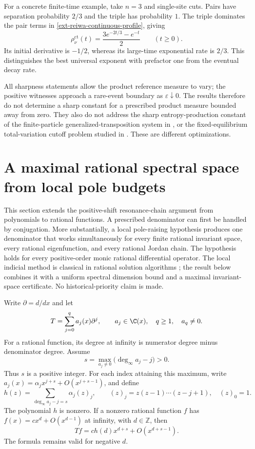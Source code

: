 \documentclass[11pt,a4paper]{article}
\theoremstyle{definition}\newtheorem{definition}[theorem]{Definition}
\theoremstyle{remark}\newtheorem{remark}[theorem]{Remark}
\numberwithin{equation}{section}
\begin{document}
For a concrete finite-time example, take $n=3$ and single-site cuts.
Pairs have separation probability $2/3$ and the triple has probability
$1$.  The triple dominates the pair terms in
\eqref{ext-reiwa-continuous-profile}, giving
\[
 \rho_{\nu}^{\mathrm{ct}}(t)
   =\frac{3e^{-2t/3}-e^{-t}}{2}\qquad(t\geq0).
\]
Its initial derivative is $-1/2$, whereas its large-time exponential
rate is $2/3$.  This distinguishes the best universal exponent with
prefactor one from the eventual decay rate.

All sharpness statements allow the product reference measure to vary;
the positive witnesses approach a rare-event boundary as
$\varepsilon\downarrow0$.  The results therefore do not determine a
sharp constant for a prescribed product measure bounded away from
zero.  They also do not address the sharp entropy-production constant
of the finite-particle generalized-transposition system in
\cite{ext-reiwa-CP}, or the fixed-equilibrium total-variation cutoff
problem studied in \cite{ext-reiwa-KS}.  These are different
optimizations.


\clearpage
{}
\section{A maximal rational spectral space from local pole budgets}
\label{ext-heisei-section}

This section extends the positive-shift resonance-chain argument from
polynomials to rational functions.  A prescribed denominator can first be
handled by conjugation.  More substantially, a local pole-raising hypothesis
produces one denominator that works simultaneously for every finite rational
invariant space, every rational eigenfunction, and every rational Jordan
chain.  The hypothesis holds for every positive-order monic rational
differential operator.  The local indicial method is classical in rational
solution algorithms \cite{ref089}; the result below combines
it with a uniform spectral dimension bound and a maximal invariant-space
certificate.  No historical-priority claim is made.

Write $\partial=d/dx$ and let
\[
 T=\sum_{j=0}^q a_j(x)\partial^j,
 \qquad a_j\in\C(x),\quad q\ge1,\quad a_q\ne0.
\]
For a rational function, its degree at infinity is numerator degree minus
denominator degree.  Assume
\[
 s=\max_{a_j\ne0}\bigl(\deg_\infty a_j-j\bigr)>0.
\]
Thus $s$ is a positive integer.  For each index attaining this maximum, write
$a_j(x)=\alpha_jx^{j+s}+O(x^{j+s-1})$, and define
\begin{equation}
 h(z)=\sum_{\deg_\infty a_j-j=s}\alpha_j(z)_j,
 \qquad (z)_j=z(z-1)\cdots(z-j+1),\quad (z)_0=1.
 \label{ext-heisei-h}
\end{equation}
The polynomial $h$ is nonzero.  If a nonzero rational function $f$ has
$f(x)=c x^d+O(x^{d-1})$ at infinity, with $d\in\mathbb Z$, then
\begin{equation}
 Tf=c h(d)x^{d+s}+O(x^{d+s-1}).
 \label{ext-heisei-infinity}
\end{equation}
The formula remains valid for negative $d$.
\end{document}
